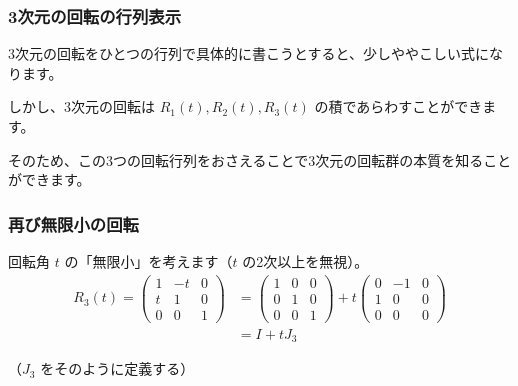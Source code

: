 \documentclass{beamer}
\theoremstyle{definition}
\begin{document}
\begin{frame}
    \frametitle{3次元の回転の行列表示}

    3次元の回転をひとつの行列で具体的に書こうとすると、少しややこしい式になります。

    しかし、3次元の回転は \(R_1(t), R_2(t), R_3(t)\) の積であらわすことができます。

    そのため、この3つの回転行列をおさえることで3次元の回転群の本質を知ることができます。
\end{frame}

\begin{frame}
    \frametitle{再び無限小の回転}

    回転角 \(t\) の「無限小」を考えます（\(t\) の2次以上を無視）。
    \begin{align*}
        R_3(t) =
        \begin{pmatrix}
            1 & - t & 0 \\
            t & 1 & 0 \\
            0 & 0 & 1
        \end{pmatrix}
        & =
        \begin{pmatrix}
            1 & 0 & 0 \\
            0 & 1 & 0 \\
            0 & 0 & 1
        \end{pmatrix}
        + t
        \begin{pmatrix}
            0 & - 1 & 0 \\
            1 & 0 & 0 \\
            0 & 0 & 0
        \end{pmatrix} \\
        & = I + t J_3
    \end{align*}

    （\(J_3\) をそのように定義する）
\end{frame}
\end{document}
